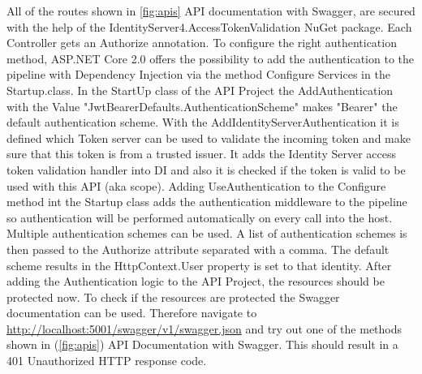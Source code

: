 All of the routes shown in \ref{fig:apis} API documentation with Swagger, are secured with the help of the IdentityServer4.AccessTokenValidation NuGet package. Each Controller gets an Authorize annotation. 
To configure the right authentication method, ASP.NET Core 2.0 offers the possibility to add the authentication to the pipeline with Dependency Injection via the method Configure Services in the Startup.class.
In the StartUp class of the API Project the AddAuthentication with the Value "JwtBearerDefaults.AuthenticationScheme" makes "Bearer" the default authentication scheme. With the AddIdentityServerAuthentication it is defined which Token server can be used to validate the incoming token and make sure that this token is from a trusted issuer. It adds the Identity Server access token validation handler into DI and also it is checked if the token is valid to be used with this API (aka scope). Adding UseAuthentication to the Configure method int the Startup class adds the authentication middleware to the pipeline so authentication will be performed automatically on every call into the host.  Multiple authentication schemes can be used. A list of authentication schemes is then passed to the Authorize attribute separated with a comma. The default scheme results in the HttpContext.User property is set to that identity. After adding the Authentication logic to the API Project, the resources should be protected now. To check if the resources are protected the Swagger documentation can be used. Therefore navigate to \url{http://localhost:5001/swagger/v1/swagger.json} and try out one of the methods shown in (\ref{fig:apis}) API Documentation with Swagger. This should result in a 401 Unauthorized HTTP response code.


